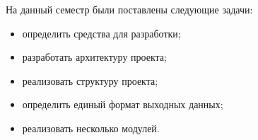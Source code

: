 На данный семестр были поставлены следующие задачи:

\begin{itemize}
\item определить средства для разработки;
\item разработать архитектуру проекта;
\item реализовать структуру проекта;
\item определить единый формат выходных данных;
\item реализовать несколько модулей.
\end{itemize}
